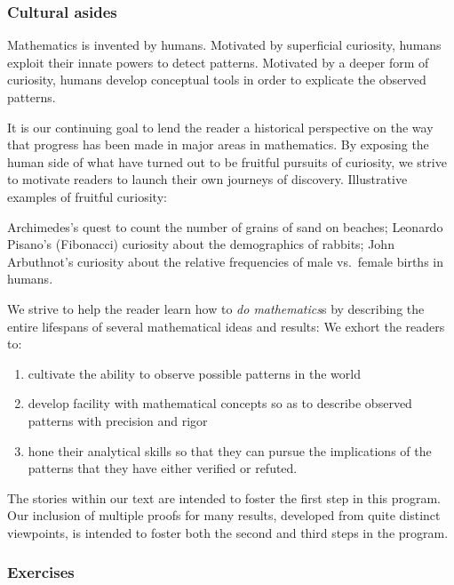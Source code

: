 \subsubsection{Cultural asides}

Mathematics is invented by humans.  Motivated by superficial curiosity, humans exploit their innate powers to detect patterns.  Motivated by a deeper form of curiosity, humans develop conceptual tools in order to explicate the observed patterns.

\smallskip

It is our continuing goal to lend the reader a historical perspective on the way that progress has been made in major areas in mathematics.  By exposing the human side of what have turned out to be fruitful pursuits of curiosity, we strive to motivate readers to launch their own journeys of discovery.  Illustrative examples of fruitful curiosity:

Archimedes's quest to count the number of grains of sand on beaches; Leonardo Pisano's (Fibonacci) curiosity about the demographics of rabbits; John Arbuthnot's curiosity about the relative frequencies of male vs.~female births in humans. 

\smallskip

We strive to help the reader learn how to {\em do mathematics}s by describing the entire lifespans of several mathematical ideas and results:  We exhort the readers to:
\begin{enumerate}
\item
cultivate the ability to observe possible patterns in the world
\item
develop facility with mathematical concepts so as to describe observed patterns with precision and rigor
\item
hone their analytical skills so that they can pursue the implications of the patterns that they have either verified or refuted.
\end{enumerate}

\medskip

The stories within our text are intended to foster the first step in this program.  Our inclusion of  multiple proofs for many results, developed from quite distinct viewpoints, is intended to foster both the second and third steps in the program. 

\subsubsection{Exercises}

